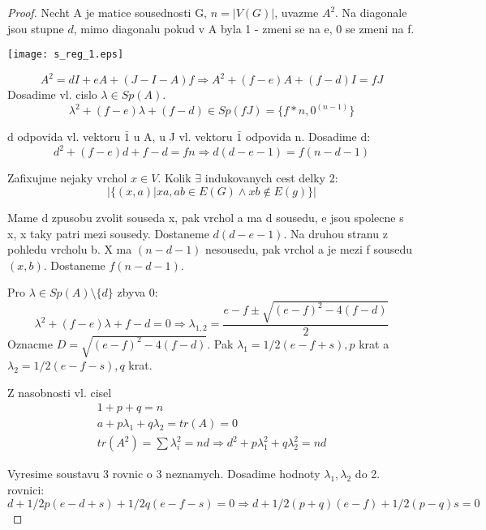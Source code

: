 \begin{proof}
	Necht A je matice sousednosti G, $n = |V(G)|$, uvazme $A^2$.
	Na diagonale jsou stupne $d$, mimo diagonalu pokud v A byla 1 - zmeni se na e, 0 se zmeni na f.

	\texttt{[image: s\_reg\_1.eps]}

	\[ A^2 = dI + eA + (J -I - A)f \Rightarrow A^2 + (f - e)A + (f - d)I = fJ \]
	Dosadime vl. cislo $\lambda \in Sp(A)$.
	\[ \lambda^2 + (f - e)\lambda + (f - d) \in Sp(fJ) = \{ f * n, 0^{(n-1)} \} \]

	d odpovida vl. vektoru $\bar{1}$ u A, u J vl. vektoru $\bar{1}$ odpovida n. Dosadime d:
	\[ d^2 + (f - e)d + f - d = fn \Rightarrow d(d - e - 1) = f(n - d - 1)\]

	Zafixujme nejaky vrchol $x \in V$. Kolik $\exists$ indukovanych cest delky 2:
	\[ |\{ (x,a) | xa, ab \in E(G) \land xb \notin E(g) \}| \]

	Mame d zpusobu zvolit souseda x, pak vrchol a ma d sousedu, e jsou spolecne s x, x taky patri mezi sousedy. Dostaneme $d (d - e - 1)$.
	Na druhou stranu z pohledu vrcholu b. X ma $(n - d - 1)$ nesousedu, pak vrchol a je mezi f sousedu $(x,b)$. Dostaneme $f(n - d - 1)$.

	Pro $\lambda \in Sp(A)\setminus \{d\}$ zbyva 0:
	\[ \lambda^2 + (f - e)\lambda + f - d = 0 \Rightarrow \lambda_{1,2} = \frac{e - f \pm \sqrt{(e - f)^2 - 4 (f - d)}}{2} \]
	Oznacme $D = \sqrt{(e - f)^2 - 4 (f - d)}$. Pak $\lambda_1 = 1/2 (e - f + s), p$ krat a $\lambda_2 = 1/2 (e - f - s), q$ krat.

	Z nasobnosti vl. cisel
	\begin{equation*}
	\begin{aligned}
	 1 + p + q = n \\
	 a + p\lambda_1 + q \lambda_2 = tr(A) = 0 \\
	 tr(A^2) = \sum \lambda_i^2 = nd \Rightarrow d^2 + p \lambda_1^2 + q \lambda_2^2 = nd
	\end{aligned}
	\end{equation*}

	Vyresime soustavu 3 rovnic o 3 neznamych.
	Dosadime hodnoty $\lambda_1, \lambda_2$ do 2. rovnici:
	\[ d + 1/2 p (e - d + s) + 1/2 q (e - f - s) = 0 \Rightarrow d + 1/2(p + q) (e - f) + 1/2 (p - q) s = 0 \]


\end{proof}
